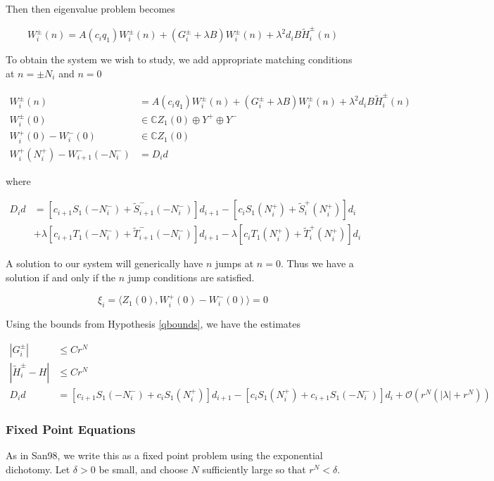 \documentclass[12pt]{article}
\def\C{{\mathbb C}}
\begin{document}
Then then eigenvalue problem becomes

\[
W_i^\pm(n) = A(c_i q_1) W_i^\pm(n) + (G_i^\pm + \lambda B) W_i^\pm(n) + \lambda^2 d_i B \tilde{H}_i^\pm(n)
\]

To obtain the system we wish to study, we add appropriate matching conditions at $n = \pm N_i$ and $n = 0$

\begin{align*}
W_i^\pm(n) &= A(c_i q_1) W_i^\pm(n) + (G_i^\pm + \lambda B) W_i^\pm(n) + \lambda^2 d_i B \tilde{H}_i^\pm(n) \\
W_i^\pm(0) &\in \C Z_1(0) \oplus Y^+ \oplus Y^- \\
W_i^+(0) - W_i^-(0) &\in \C Z_1(0) \\
W_i^+(N_i^+) - W_{i+1}^-(-N_i^-) &= D_i d
\end{align*}

where

\begin{align*}
D_i d &= [ c_{i+1} S_1(-N_i^-) + \tilde{S}_{i+1}^-(-N_i^-)] d_{i+1}
- [ c_i S_1(N_i^+) + \tilde{S}_i^+(N_i^+)] d_i \\
&+ \lambda[ c_{i+1} T_1(-N_i^-) + \tilde{T}_{i+1}^-(-N_i^-)] d_{i+1}
- \lambda[ c_i T_1(N_i^+) + \tilde{T}_i^+(N_i^+)] d_i 
\end{align*}

A solution to our system will generically have $n$ jumps at $n = 0$. Thus we have a solution if and only if the $n$ jump conditions are satisfied.

\begin{equation}\label{jumpcond}
\xi_i = \langle Z_1(0), W_i^+(0) - W_i^-(0) \rangle = 0
\end{equation}

Using the bounds from Hypothesis \ref{qbounds}, we have the estimates

\begin{align*}
|G_i^\pm| &\leq C r^N \\
|\tilde{H}_i^\pm - H| &\leq C r^N \\
D_i d &= [ c_{i+1} S_1(-N_i^-) + c_i S_1(N_i^+) ] d_{i+1}
- [ c_i S_1(N_i^+) + c_{i+1} S_1(-N_i^-) ] d_i 
+\mathcal{O}(r^N( |\lambda| + r^N))
\end{align*}

\subsubsection{Fixed Point Equations}

As in San98, we write this as a fixed point problem using the exponential dichotomy. Let $\delta > 0$ be small, and choose $N$ sufficiently large so that $r^N < \delta$. \\
\end{document}

